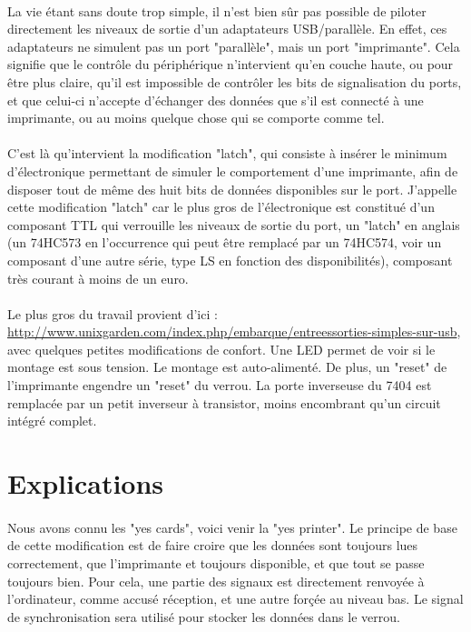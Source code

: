 \documentclass[11pt,a4paper]{book}
\begin{document}
\paragraph*{} 
La vie \'etant sans doute trop simple, il n'est bien s\^ur pas possible de piloter directement
les niveaux de sortie d'un adaptateurs USB/parall\`ele. En effet, ces adaptateurs ne simulent pas
un port "parall\`ele", mais un port "imprimante". Cela signifie que le contr\^ole du p\'eriph\'erique
n'intervient qu'en couche haute, ou pour \^etre plus claire, qu'il est impossible de contr\^oler 
les bits de signalisation du ports, et que celui-ci n'accepte d'\'echanger des donn\'ees que
s'il est connect\'e \`a une imprimante, ou au moins quelque chose qui se comporte comme tel.

\paragraph*{}
C'est l\`a qu'intervient la modification "latch", qui consiste \`a ins\'erer le minimum 
d'\'electronique permettant de simuler le comportement d'une imprimante, afin de disposer tout
de m\^eme des huit bits de donn\'ees disponibles sur le port. J'appelle cette modification
"latch" car le plus gros de l'\'electronique est constitu\'e d'un composant TTL qui
verrouille les niveaux de sortie du port, un "latch" en anglais (un 74HC573 en l'occurrence qui 
peut \^etre remplac\'e par un 74HC574, voir un composant d'une autre s\'erie, type LS en fonction
 des disponibilit\'es), composant tr\`es courant \`a moins de un euro.

\paragraph*{}
Le plus gros du travail provient d'ici : \url{http://www.unixgarden.com/index.php/embarque/entreessorties-simples-sur-usb}, 
avec quelques petites modifications de confort. Une LED permet de voir si le montage est sous tension. Le 
montage est auto-aliment\'e. De plus, un "reset" de l'imprimante engendre un "reset" du
verrou. La porte inverseuse du 7404 est remplac\'ee par un petit inverseur \`a transistor, moins 
encombrant qu'un circuit int\'egr\'e complet.

\section{Explications}

\paragraph*{}
Nous avons connu les "yes cards", voici venir la "yes printer". Le principe de
 base de cette modification est de faire croire que les donn\'ees sont toujours lues
 correctement, que l'imprimante et toujours disponible, et que tout se passe toujours bien.
  Pour cela, une partie des
 signaux est directement renvoy\'ee \`a l'ordinateur, comme accus\'e r\'eception, et
 une autre for\c{c}\'ee au niveau bas. Le signal de 
 synchronisation sera utilis\'e pour stocker les donn\'ees dans le verrou.
 
\end{document}
